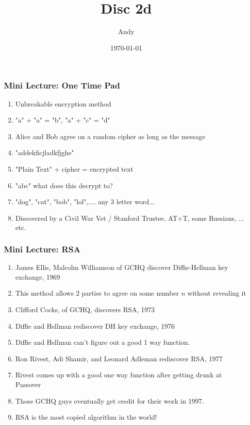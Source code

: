 \documentclass{beamer}
\title{Disc 2d}
\author{Andy}
\institute{UC Berkeley}
\date{\today}
\begin{document}
\begin{frame}
    \titlepage
\end{frame}
\begin{frame}
    \frametitle{Mini Lecture: One Time Pad}

    \begin{enumerate}[<+->]
        \item Unbreakable encryption method
        \item "a" + "a" = "b", "a" + "c" = "d"
        \item Alice and Bob agree on a random cipher as long as the message 
        \item "addekficjladkfjghe"
        \item "Plain Text" + cipher = encrypted text
        \item "abc" what does this decrypt to?
        \item "dog", "cat", "bob", "lol",.... any 3 letter word...
        \item Discovered by a Civil War Vet / Stanford Trustee, AT+T, some Russians, ... etc.
    \end{enumerate}

\end{frame}

\begin{frame}
    \frametitle{Mini Lecture: RSA}

    \begin{enumerate}[<+->]
        \item James Ellis, Malcolm Williamson of GCHQ discover Diffie-Hellman key exchange, 1969
        \item This method allows 2 parties to agree on some number $n$ without revealing it
        \item Clifford Cocks, of GCHQ, discovers RSA, 1973
        \item Diffie and Hellman rediscover DH key exchange, 1976
        \item Diffie and Hellman can't figure out a good 1 way function.
        \item Ron Rivest, Adi Shamir, and Leonard Adleman rediscover RSA, 1977
        \item Rivest comes up with a good one way function after getting drunk at Passover
        \item Those GCHQ guys eventually get credit for their work in 1997.
        \item RSA is the most copied algorithm in the world!
    \end{enumerate}

\end{frame}
\end{document}
